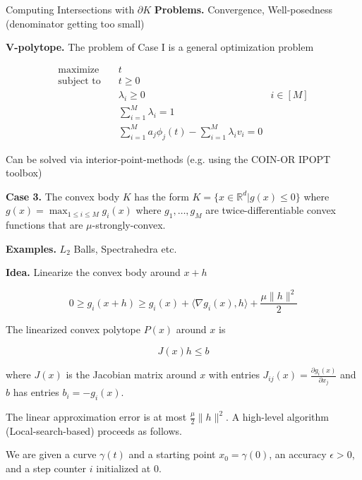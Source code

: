 \documentclass[10pt]{beamer}
\begin{document}
\begin{frame}[allowframebreaks]{Computing Intersections with $\partial K$}
    \textbf{Problems.} Convergence, Well-posedness (denominator getting too small)

    \framebreak
    
    \textbf{V-polytope.} The problem of Case I is a general optimization problem 
    
    \begin{align*}
        \text{maximize} \quad & t & \\
        \text{subject to} \quad & t \ge 0 \\
        & \lambda_i \ge 0 & i \in [M] \\
        & \sum_{i = 1}^M \lambda_i = 1 \\
        & \sum_{i = 1}^M a_j \phi_j(t) - \sum_{i = 1}^M \lambda_i v_i = 0 
    \end{align*}
    

    Can be solved via interior-point-methods (e.g. using the COIN-OR IPOPT toolbox)

    \framebreak
    
    \textbf{Case 3.} The convex body $K$ has the form $K = \{ x \in \mathbb R^d | g(x) \le 0 \}$ where $g(x) = \max_{1 \le i \le M} g_i(x)$ where $g_1, \dots, g_M$ are twice-differentiable convex functions that are $\mu$-strongly-convex. 
    
    \medskip
    
    \textbf{Examples.} $L_2$ Balls, Spectrahedra etc.
    
    \medskip
    
    \textbf{Idea.} Linearize the convex body around $x + h$
    
    $$0 \ge g_i(x + h) \ge g_i(x) + \langle \nabla g_i(x), h \rangle + \frac {\mu \| h \|^2}  2 $$
    
    The linearized convex polytope $P(x)$ around $x$ is 
    
    $$J(x) h \le b$$
    
    where $J(x)$ is the Jacobian matrix around $x$ with entries $J_{ij}(x) = \frac {\partial g_i(x)} {\partial x_j}$ and $b$ has entries $b_i = -g_i(x)$.
    
    \framebreak 
    
    The linear approximation error is at most $\frac {\mu} 2 \| h \|^2$.     A high-level algorithm (Local-search-based) proceeds as follows.
    
    \medskip

    We are given a curve $\gamma(t)$ and a starting point $x_0 = \gamma(0)$, an accuracy $\epsilon > 0$, and a step counter $i$ initialized at 0.
    

\end{frame}
\end{document}
